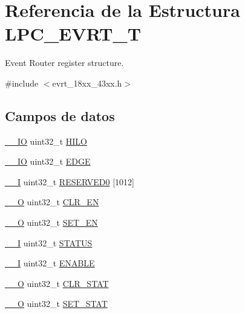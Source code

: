 \hypertarget{struct_l_p_c___e_v_r_t___t}{}\section{Referencia de la Estructura L\+P\+C\+\_\+\+E\+V\+R\+T\+\_\+T}
\label{struct_l_p_c___e_v_r_t___t}


Event Router register structure.  




{\ttfamily \#include $<$evrt\+\_\+18xx\+\_\+43xx.\+h$>$}

\subsection*{Campos de datos}
\begin{DoxyCompactItemize}
\item 
\hyperlink{core__sc300_8h_aec43007d9998a0a0e01faede4133d6be}{\+\_\+\+\_\+\+IO} uint32\+\_\+t \hyperlink{struct_l_p_c___e_v_r_t___t_aa0242aa69e2f2c5462e40d159ceec6aa}{H\+I\+LO}
\item 
\hyperlink{core__sc300_8h_aec43007d9998a0a0e01faede4133d6be}{\+\_\+\+\_\+\+IO} uint32\+\_\+t \hyperlink{struct_l_p_c___e_v_r_t___t_afc78c9d3a56c3f7e8c47affdf245df6b}{E\+D\+GE}
\item 
\hyperlink{core__sc300_8h_af63697ed9952cc71e1225efe205f6cd3}{\+\_\+\+\_\+I} uint32\+\_\+t \hyperlink{struct_l_p_c___e_v_r_t___t_aa30fe60f09b5291251c6166bca12b9aa}{R\+E\+S\+E\+R\+V\+E\+D0} \mbox{[}1012\mbox{]}
\item 
\hyperlink{core__sc300_8h_a7e25d9380f9ef903923964322e71f2f6}{\+\_\+\+\_\+O} uint32\+\_\+t \hyperlink{struct_l_p_c___e_v_r_t___t_a0d317a6488644b87e17e5f559c08289f}{C\+L\+R\+\_\+\+EN}
\item 
\hyperlink{core__sc300_8h_a7e25d9380f9ef903923964322e71f2f6}{\+\_\+\+\_\+O} uint32\+\_\+t \hyperlink{struct_l_p_c___e_v_r_t___t_ad4ee2600dffc97b5487b479978433ed0}{S\+E\+T\+\_\+\+EN}
\item 
\hyperlink{core__sc300_8h_af63697ed9952cc71e1225efe205f6cd3}{\+\_\+\+\_\+I} uint32\+\_\+t \hyperlink{struct_l_p_c___e_v_r_t___t_aece2c880dc5ba01a2fc9326dc080dc26}{S\+T\+A\+T\+US}
\item 
\hyperlink{core__sc300_8h_af63697ed9952cc71e1225efe205f6cd3}{\+\_\+\+\_\+I} uint32\+\_\+t \hyperlink{struct_l_p_c___e_v_r_t___t_a92c23e9b88593bf89218d85da0c67585}{E\+N\+A\+B\+LE}
\item 
\hyperlink{core__sc300_8h_a7e25d9380f9ef903923964322e71f2f6}{\+\_\+\+\_\+O} uint32\+\_\+t \hyperlink{struct_l_p_c___e_v_r_t___t_a2736f94695ea3082afc55537cc4172b4}{C\+L\+R\+\_\+\+S\+T\+AT}
\item 
\hyperlink{core__sc300_8h_a7e25d9380f9ef903923964322e71f2f6}{\+\_\+\+\_\+O} uint32\+\_\+t \hyperlink{struct_l_p_c___e_v_r_t___t_aa392d0314798880efcc1243457aad369}{S\+E\+T\+\_\+\+S\+T\+AT}
\end{DoxyCompactItemize}


